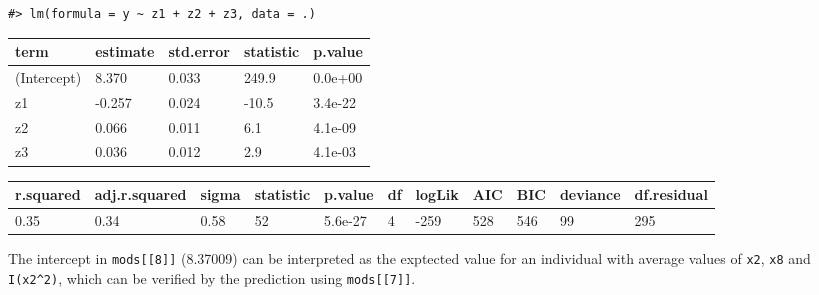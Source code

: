 \documentclass[a4paper]{article}
\newenvironment{Shaded}{\begin{snugshade}}{\end{snugshade}}
\newcommand{\DecValTok}[1]{\textcolor[rgb]{0.00,0.00,0.81}{#1}}
\newcommand{\FloatTok}[1]{\textcolor[rgb]{0.00,0.00,0.81}{#1}}
\newcommand{\KeywordTok}[1]{\textcolor[rgb]{0.13,0.29,0.53}{\textbf{#1}}}
\newcommand{\NormalTok}[1]{#1}
\newcommand{\OperatorTok}[1]{\textcolor[rgb]{0.81,0.36,0.00}{\textbf{#1}}}
\newcommand{\StringTok}[1]{\textcolor[rgb]{0.31,0.60,0.02}{#1}}
\begin{document}
\begin{verbatim}
#> lm(formula = y ~ z1 + z2 + z3, data = .)
\end{verbatim}

\begin{table}[H]
\centering
\begin{tabular}{lllll}
\toprule
term & estimate & std.error & statistic & p.value\\
\midrule
(Intercept) & 8.370 & 0.033 & 249.9 & 0.0e+00\\
z1 & -0.257 & 0.024 & -10.5 & 3.4e-22\\
z2 & 0.066 & 0.011 & 6.1 & 4.1e-09\\
z3 & 0.036 & 0.012 & 2.9 & 4.1e-03\\
\bottomrule
\end{tabular}
\end{table}

\begin{table}[H]
\centering
\begin{tabular}{lllllllllll}
\toprule
r.squared & adj.r.squared & sigma & statistic & p.value & df & logLik & AIC & BIC & deviance & df.residual\\
\midrule
0.35 & 0.34 & 0.58 & 52 & 5.6e-27 & 4 & -259 & 528 & 546 & 99 & 295\\
\bottomrule
\end{tabular}
\end{table}

The intercept in \texttt{mods{[}{[}8{]}{]}} (8.37009) can be interpreted
as the exptected value for an individual with average values of
\texttt{x2}, \texttt{x8} and \texttt{I(x2\^{}2)}, which can be verified
by the prediction using \texttt{mods{[}{[}7{]}{]}}.

\begin{Shaded}
\end{Shaded}
\end{document}
